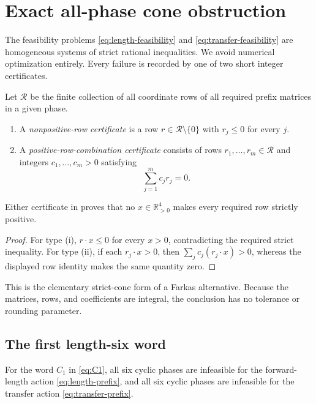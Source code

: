 \section{Exact all-phase cone obstruction}
\label{sec:cone}

The feasibility problems \eqref{eq:length-feasibility} and
\eqref{eq:transfer-feasibility} are homogeneous systems of strict rational
inequalities.  We avoid numerical optimization entirely.  Every failure is
recorded by one of two short integer certificates.

\begin{definition}
\label{def:certificate-types}
Let $\mathcal R$ be the finite collection of all coordinate rows of all
required prefix matrices in a given phase.
\begin{enumerate}[label=(\roman*)]
\item A \emph{nonpositive-row certificate} is a row
  $r\in\mathcal R\setminus\{0\}$ with $r_j\leq0$ for every $j$.
\item A \emph{positive-row-combination certificate} consists of rows
  $r_1,\dots,r_m\in\mathcal R$ and integers $c_1,\dots,c_m>0$ satisfying
  \[
    \sum_{j=1}^m c_jr_j=0.
  \]
\end{enumerate}
\end{definition}

\begin{lemma}
\label{lem:exact-infeasibility}
Either certificate in  proves that no
$x\in\mathbb R_{>0}^4$ makes every required row strictly positive.
\end{lemma}

\begin{proof}
For type (i), $r\cdot x\leq0$ for every $x>0$, contradicting the required
strict inequality.  For type (ii), if each $r_j\cdot x>0$, then
$\sum_jc_j(r_j\cdot x)>0$, whereas the displayed row identity makes the same
quantity zero.
\end{proof}

This is the elementary strict-cone form of a Farkas alternative.  Because the
matrices, rows, and coefficients are integral, the conclusion has no
tolerance or rounding parameter.

\subsection{The first length-six word}

\begin{theorem}
\label{thm:C1-all-phases}
For the word $C_1$ in \eqref{eq:C1}, all six cyclic phases are infeasible for
the forward-length action \eqref{eq:length-prefix}, and all six cyclic phases
are infeasible for the transfer action \eqref{eq:transfer-prefix}.
\end{theorem}

